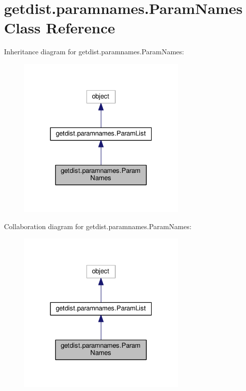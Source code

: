 \hypertarget{classgetdist_1_1paramnames_1_1ParamNames}{}\section{getdist.\+paramnames.\+Param\+Names Class Reference}
\label{classgetdist_1_1paramnames_1_1ParamNames}


Inheritance diagram for getdist.\+paramnames.\+Param\+Names\+:
\nopagebreak
\begin{figure}[H]
\begin{center}
\leavevmode
\includegraphics[width=232pt]{classgetdist_1_1paramnames_1_1ParamNames__inherit__graph}
\end{center}
\end{figure}


Collaboration diagram for getdist.\+paramnames.\+Param\+Names\+:
\nopagebreak
\begin{figure}[H]
\begin{center}
\leavevmode
\includegraphics[width=232pt]{classgetdist_1_1paramnames_1_1ParamNames__coll__graph}
\end{center}
\end{figure}
